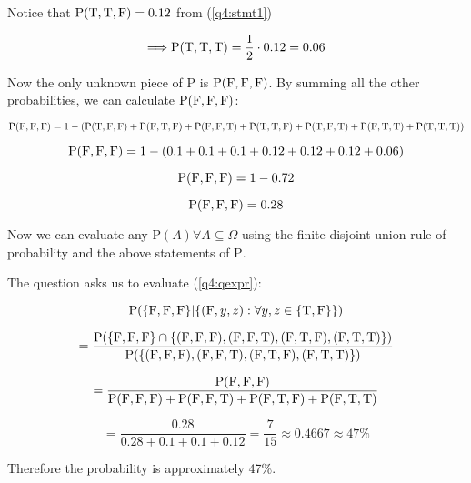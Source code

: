 Notice that $\mathrm{P}( \mathrm{T}, \mathrm{T}, \mathrm{F}) = 0.12$ from (\ref{q4:stmt1})

\[
\Longrightarrow \mathrm{P} (\mathrm{T}, \mathrm{T}, \mathrm{T}) = \frac{1}{2} \cdot 0.12 = 0.06
\]

Now the only unknown piece of $\mathrm{P}$ is $\mathrm{P} (\mathrm{F}, \mathrm{F}, \mathrm{F})$.
By summing all the other probabilities, we can calculate $\mathrm{P} (\mathrm{F}, \mathrm{F}, \mathrm{F})$:

\[
\mathrm{P} (\mathrm{F}, \mathrm{F}, \mathrm{F}) = 1 - \left( \mathrm{P} (\mathrm{T}, \mathrm{F}, \mathrm{F}) + \mathrm{P} (\mathrm{F}, \mathrm{T}, \mathrm{F}) + \mathrm{P} (\mathrm{F}, \mathrm{F}, \mathrm{T}) + \mathrm{P} (\mathrm{T}, \mathrm{T}, \mathrm{F}) + \mathrm{P} (\mathrm{T}, \mathrm{F}, \mathrm{T}) + \mathrm{P} (\mathrm{F}, \mathrm{T}, \mathrm{T}) + \mathrm{P} (\mathrm{T}, \mathrm{T}, \mathrm{T}) \right)
\]

\[
\mathrm{P} (\mathrm{F}, \mathrm{F}, \mathrm{F}) = 1 - (0.1 + 0.1 + 0.1 + 0.12 + 0.12 + 0.12 + 0.06)
\]

\[
\mathrm{P} (\mathrm{F}, \mathrm{F}, \mathrm{F}) = 1 - 0.72
\]

\[
\mathrm{P} (\mathrm{F}, \mathrm{F}, \mathrm{F}) = 0.28
\]

Now we can evaluate any $\mathrm{P} (A) \forall A \subseteq \Omega$ using the finite disjoint union rule of probability and the above statements of $\mathrm{P}$.

The question asks us to evaluate (\ref{q4:qexpr}):

\begin{equation} \label{q4:qexpr}
\mathrm{P}(\{ \mathrm{F}, \mathrm{F}, \mathrm{F} \} | \{ (\mathrm{F}, y, z) : \forall y, z \in \{ \mathrm{T}, \mathrm{F} \} \})
\end{equation}

\[
= \frac{\mathrm{P} (\{ \mathrm{F}, \mathrm{F}, \mathrm{F} \} \cap \{ (\mathrm{F}, \mathrm{F}, \mathrm{F}), (\mathrm{F}, \mathrm{F}, \mathrm{T}), (\mathrm{F}, \mathrm{T}, \mathrm{F}), (\mathrm{F}, \mathrm{T}, \mathrm{T}) \})}{\mathrm{P}(\{
(\mathrm{F}, \mathrm{F}, \mathrm{F}), (\mathrm{F}, \mathrm{F}, \mathrm{T}), (\mathrm{F}, \mathrm{T}, \mathrm{F}), (\mathrm{F}, \mathrm{T}, \mathrm{T})
\})}
\]

\[
= \frac{\mathrm{P} (\mathrm{F}, \mathrm{F}, \mathrm{F})}{\mathrm{P} (\mathrm{F}, \mathrm{F}, \mathrm{F}) + \mathrm{P} (\mathrm{F}, \mathrm{F}, \mathrm{T}) + \mathrm{P} (\mathrm{F}, \mathrm{T}, \mathrm{F}) + \mathrm{P} (\mathrm{F}, \mathrm{T}, \mathrm{T})}
\]

\[
= \frac{0.28}{0.28 + 0.1 + 0.1 + 0.12} = \frac{7}{15} \approx 0.4667 \approx 47\%
\]

Therefore the probability is approximately 47\%.